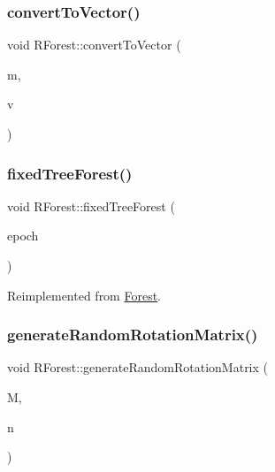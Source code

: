 \mbox{\label{classRForest_ada11eb452d05c98cd481b9080a5703a3}} 
\subsubsection{\texorpdfstring{convert\+To\+Vector()}{convertToVector()}}
{\footnotesize\ttfamily void R\+Forest\+::convert\+To\+Vector (\begin{DoxyParamCaption}\item[{Eigen\+::\+Matrix\+Xd \&}]{m,  }\item[{std\+::vector$<$ std\+::vector$<$ double $>$ $>$ \&}]{v }\end{DoxyParamCaption})}

\mbox{\label{classRForest_af8c8c06e5875c4a2a539d38ec65c9a7e}} 
\subsubsection{\texorpdfstring{fixed\+Tree\+Forest()}{fixedTreeForest()}}
{\footnotesize\ttfamily void R\+Forest\+::fixed\+Tree\+Forest (\begin{DoxyParamCaption}\item[{int}]{epoch }\end{DoxyParamCaption})\hspace{0.3cm}{\ttfamily [virtual]}}



Reimplemented from \hyperlink{classForest_a0699073aa8d6b46fdbdc36b7299a1a34}{Forest}.

\mbox{\label{classRForest_ab1f0edda495b87ef9286907d44f2f8ff}} 
\subsubsection{\texorpdfstring{generate\+Random\+Rotation\+Matrix()}{generateRandomRotationMatrix()}}
{\footnotesize\ttfamily void R\+Forest\+::generate\+Random\+Rotation\+Matrix (\begin{DoxyParamCaption}\item[{Eigen\+::\+Matrix\+Xd \&}]{M,  }\item[{int}]{n }\end{DoxyParamCaption})}

